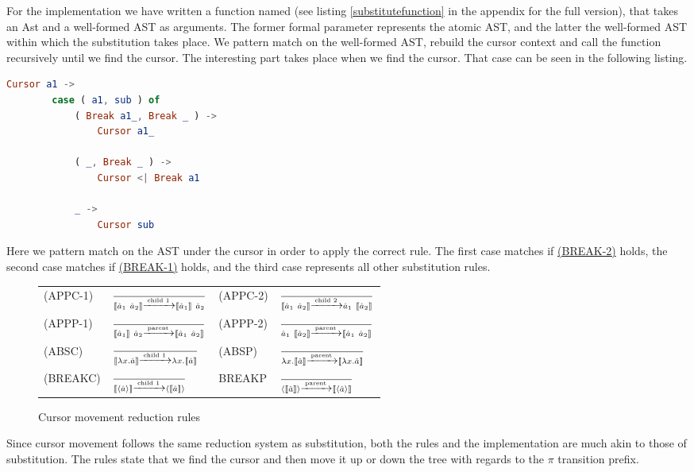 For the implementation we have written a function named  (see
listing \ref{substitutefunction} in the appendix for the full version), that
takes an Ast and a well-formed AST as arguments. The former formal parameter
represents the atomic AST, and the latter the well-formed AST within which the
substitution takes place. We pattern match on the well-formed AST, rebuild the
cursor context and call the  function recursively until we find
the cursor. The interesting part takes place when we find the cursor. That case
can be seen in the following listing.

\begin{lstlisting}[language=elm,%
                   label="substitute-at-cursor",%
                   gobble=4,%
                   ]
    Cursor a1 ->
        case ( a1, sub ) of
            ( Break a1_, Break _ ) ->
                Cursor a1_

            ( _, Break _ ) ->
                Cursor <| Break a1

            _ ->
                Cursor sub
\end{lstlisting}

Here we pattern match on the AST under the cursor in order to apply the correct
rule. The first case matches if
\hyperref[fig:substitutionreductionrules]{(BREAK-2)} holds, the second case
matches if \hyperref[fig:substitutionreductionrules]{(BREAK-1)} holds, and the
third case represents all other substitution rules. \\

\begin{figure*}
  \center
  \renewcommand{\arraystretch}{2}
  \begin{tabular}{llll}
    \scriptsize(APPC-1) & $\frac{} {\llbracket \hat{a}_1~\hat{a}_2 \rrbracket\xrightarrow[]{\text{child 1}}\llbracket \hat{a}_1 \rrbracket~\hat{a}_2}$ & \scriptsize(APPC-2) & $\frac{} {\llbracket \hat{a}_1~\hat{a}_2 \rrbracket\xrightarrow[]{\text{child 2}}\hat{a}_1~\llbracket \hat{a}_2 \rrbracket}$ \\
    \scriptsize(APPP-1) & $\frac{} {\llbracket \hat{a}_1 \rrbracket~\hat{a}_2\xrightarrow[]{\text{parent}}\llbracket \hat{a}_1~\hat{a}_2 \rrbracket}$ & \scriptsize(APPP-2) & $\frac{} {\hat{a}_1~\llbracket \hat{a}_2 \rrbracket\xrightarrow[]{\text{parent}}\llbracket \hat{a}_1~\hat{a}_2 \rrbracket}$ \\
    \scriptsize(ABSC)   & $\frac{} {\llbracket \lambda x.\hat{a} \rrbracket\xrightarrow[]{\text{child 1}}\lambda x.\llbracket \hat{a} \rrbracket}$    & \scriptsize{(ABSP)} & $\frac{} {\lambda x.\llbracket \hat{a} \rrbracket\xrightarrow[]{\text{parent}}\llbracket \lambda x.\hat{a} \rrbracket}$    \\
    \scriptsize(BREAKC) & $\frac{} {\llbracket \langle \hat{a} \rangle \rrbracket\xrightarrow[]{\text{child 1}}\langle \llbracket \hat{a} \rrbracket \rangle} $ & \scriptsize{BREAKP} & $\frac{} {\langle \llbracket \hat{a} \rrbracket \rangle\xrightarrow[]{\text{parent}}\llbracket \langle \hat{a} \rangle \rrbracket}$
  \end{tabular}
  \caption{Cursor movement reduction rules}
  \label{fig:cursorreductionrules}
\end{figure*}

Since cursor movement follows the same reduction system as substitution, both
the rules and the implementation are much akin to those of substitution. The
rules state that we find the cursor and then move it up or down the tree with
regards to the $\pi$ transition prefix.
\\

